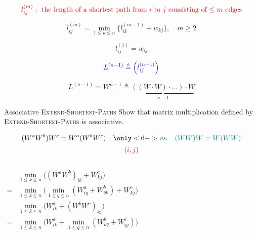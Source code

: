 
\begin{frame}{}
  \[
    \textcolor{red}{l_{ij}^{(m)}: \text{ the length of a shortest path from $i$ to $j$ consisting of $\le m$ edges}}
  \]

  \pause
  \[
    l_{ij}^{(m)} = \min_{1 \le k \le n} \big\{ l_{ik}^{(m-1)} + w_{kj} \big\}, \quad m \ge 2
  \]

  \pause
  \[
    l_{ij}^{(1)} = w_{ij}
  \]

  \pause
  \[
    \textcolor{blue}{L^{(n-1)} \triangleq \left(l_{ij}^{(n-1)}\right)}
  \]

  \pause
  \[
    L^{(n-1)} = W^{n-1} \triangleq \underbrace{\left(\left(W \cdot W\right) \cdot \ldots\right) \cdot W}_{n-1}
  \]
\end{frame}

\begin{frame}{}
  \begin{exampleblock}{Associative \textsc{Extend-Shortest-Paths}}
    Show that matrix multiplication defined by \textsc{Extend-Shortest-Paths} is associative.
  \end{exampleblock}

  \pause
  \[
    (W^{a} W^{b}) W^{c} = W^{a} (W^{b} W^{c}) \quad \only<6->{\teal{\text{\it vs.}\quad (WW)W = W(WW)}}
  \]
  \pause
  \[
    \textcolor{red}{(i,j)}
  \]
  \begin{columns}
      \begin{align*}
	&\min_{1 \le k \le n} \Big( (W^{a} W^{b})_{ik} + W^{c}_{kj} \Big) \\
	= &\min_{1 \le k \le n} \Big( \min_{1 \le q \le n} (W^{a}_{iq} + W^{b}_{qk}) + W^{c}_{kj} \Big)
      \end{align*}
      \begin{align*}
	&\min_{1 \le k \le n} \Big( W^{a}_{ik} + (W^{b} W^{c})_{kj} \Big) \\
	= &\min_{1 \le k \le n} \Big( W^{a}_{ik} + \min_{1 \le q \le n} (W^{b}_{kq} + W^{c}_{qj}) \Big)
      \end{align*}
  \end{columns}

  \pause
  \vspace{0.30cm}
  \begin{center}
     \\[6pt] \pause
  \end{center}
\end{frame}

